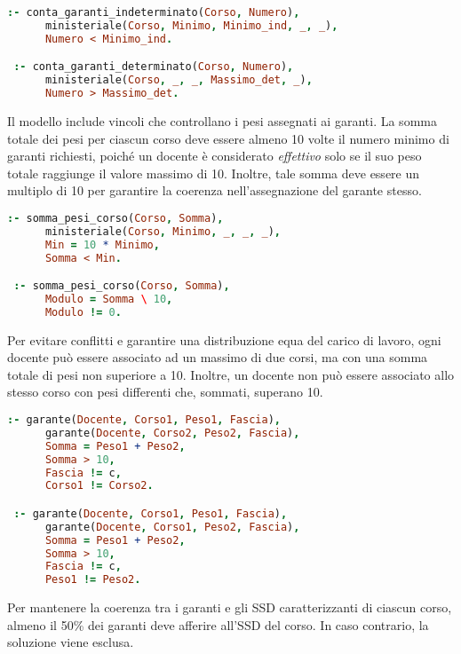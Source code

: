 \begin{lstlisting}[language=prolog, caption={Vincoli su garanti a tempo indeterminato e determinato.}]
 :- conta_garanti_indeterminato(Corso, Numero),
      ministeriale(Corso, Minimo, Minimo_ind, _, _),
      Numero < Minimo_ind.

 :- conta_garanti_determinato(Corso, Numero),
      ministeriale(Corso, _, _, Massimo_det, _),
      Numero > Massimo_det.
\end{lstlisting}

Il modello include vincoli che controllano i pesi assegnati ai garanti. La somma totale dei 
pesi per ciascun corso deve essere almeno 10 volte il numero minimo di garanti richiesti, 
poiché un docente è considerato \textit{effettivo} solo se il suo peso totale raggiunge il valore 
massimo di 10. Inoltre, tale somma deve essere un multiplo di 10 per garantire la coerenza 
nell'assegnazione del garante stesso.

\begin{lstlisting}[language=prolog, caption={Vincoli sui pesi assegnati ai garanti.}]
 :- somma_pesi_corso(Corso, Somma),
      ministeriale(Corso, Minimo, _, _, _),
      Min = 10 * Minimo,
      Somma < Min.

 :- somma_pesi_corso(Corso, Somma),
      Modulo = Somma \ 10,
      Modulo != 0.
\end{lstlisting}

Per evitare conflitti e garantire una distribuzione equa del carico di lavoro, ogni docente 
può essere associato ad un massimo di due corsi, ma con una somma totale di pesi non superiore 
a 10. Inoltre, un docente non può essere associato allo stesso corso con pesi differenti che, 
sommati, superano 10.

\begin{lstlisting}[language=prolog, caption={Vincoli sulla distribuzione dei pesi per docente.}]
 :- garante(Docente, Corso1, Peso1, Fascia),
      garante(Docente, Corso2, Peso2, Fascia),
      Somma = Peso1 + Peso2,
      Somma > 10,
      Fascia != c,
      Corso1 != Corso2.

 :- garante(Docente, Corso1, Peso1, Fascia),
      garante(Docente, Corso1, Peso2, Fascia),
      Somma = Peso1 + Peso2,
      Somma > 10,
      Fascia != c,
      Peso1 != Peso2.
\end{lstlisting}

Per mantenere la coerenza tra i garanti e gli SSD caratterizzanti di ciascun corso, almeno 
il 50\% dei garanti deve afferire all'SSD del corso. In caso contrario, la soluzione viene esclusa.

